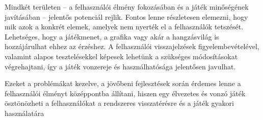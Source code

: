 Mindkét területen – a felhasználói élmény fokozásában és a játék minőségének javításában – jelentős potenciál rejlik. Fontos lenne részletesen elemezni, hogy mik azok a konkrét elemek, amelyek nem nyerték el a felhasználók tetszését. Lehetséges, hogy a játékmenet, a grafika vagy akár a hangzásvilág is hozzájárulhat ehhez az érzéshez. A felhasználói visszajelzések figyelembevételével, valamint alapos tesztelésekkel képesek lehetünk a szükséges módosításokat végrehajtani, így a játék vonzereje és használhatósága jelentősen javulhat.

Ezeket a problémákat kezelve, a jövőbeni fejlesztések során érdemes lenne a felhasználói élményt középpontba állítani, hiszen egy élvezetes és vonzó játék ösztönözheti a felhasználókat a rendszeres visszatérésre és a játék gyakori használatára
